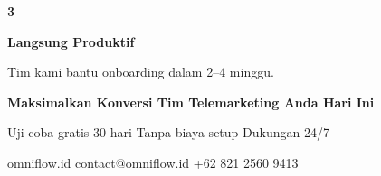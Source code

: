 \documentclass[a4paper]{article}
\begin{document}
\begin{center}
\begin{minipage}[t]{0.318\textwidth}
{\begin{minipage}{\dimexpr\linewidth-2\fboxsep\relax}
            \begin{center}
                {\fontsize{22}{26}\selectfont\bfseries\color{BluePrimary} 3}
            \end{center}
            \vspace{2pt}
            \begin{center}
                {\fontsize{10}{13}\selectfont\bfseries\color{BlueDark} Langsung Produktif}\par\vspace{3pt}
                {\fontsize{9}{12}\selectfont\color{TextDark} Tim kami bantu onboarding dalam 2--4 minggu.}
            \end{center}
            \vspace{6pt}
        \end{minipage}}
\end{minipage}
\end{center}

\vspace{8pt}

{\setlength{\fboxsep}{10pt}\setlength{\fboxrule}{0pt}%
\noindent\colorbox{BluePrimary}{%
    \begin{minipage}{\dimexpr\textwidth-2\fboxsep\relax}
        \centering
        {\fontsize{13}{16}\selectfont\bfseries\color{White}
        Maksimalkan Konversi Tim Telemarketing Anda Hari Ini}\par\vspace{3pt}
        {\fontsize{9.5}{12}\selectfont\color{BlueMid}
        Uji coba gratis 30 hari \enspace\textbullet\enspace Tanpa biaya setup \enspace\textbullet\enspace Dukungan 24/7}\par\vspace{2pt}
        {\fontsize{9.5}{12}\selectfont\color{BlueLight}
        omniflow.id \enspace\textbullet\enspace contact@omniflow.id \enspace\textbullet\enspace +62 821 2560 9413}
    \end{minipage}}}

\restoregeometry
\pagestyle{empty}
\end{document}
